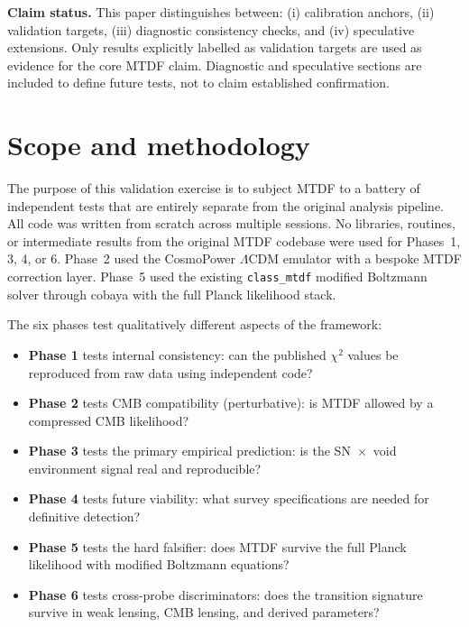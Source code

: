 \documentclass[11pt,a4paper]{article}
\begin{document}
\tableofcontents

\begin{mdframed}[linecolor=accent,linewidth=0.5pt,backgroundcolor=callout-bg,leftline=true,rightline=true,topline=true,bottomline=true,innerleftmargin=8pt,innerrightmargin=8pt,innertopmargin=6pt,innerbottommargin=6pt]
\textbf{Claim status.}
This paper distinguishes between:
(i) calibration anchors,
(ii) validation targets,
(iii) diagnostic consistency checks, and
(iv) speculative extensions.
Only results explicitly labelled as validation targets are used as evidence for the core MTDF claim. Diagnostic and speculative sections are included to define future tests, not to claim established confirmation.
\end{mdframed}

\section{Scope and methodology}
\label{sec:sec1}
The purpose of this validation exercise is to subject MTDF to a battery of independent tests that are entirely separate from the original analysis pipeline. All code was written from scratch across multiple sessions. No libraries, routines, or intermediate results from the original MTDF codebase were used for Phases~1, 3, 4, or 6. Phase~2 used the CosmoPower $\Lambda$CDM emulator with a bespoke MTDF correction layer. Phase~5 used the existing \texttt{class\_\allowbreak{}mtdf} modified Boltzmann solver through cobaya with the full Planck likelihood stack.

The six phases test qualitatively different aspects of the framework:

\begin{itemize}
  \item \textbf{Phase 1} tests internal consistency: can the published $\chi$$^{2}$ values be reproduced from raw data using independent code?
  \item \textbf{Phase 2} tests CMB compatibility (perturbative): is MTDF allowed by a compressed CMB likelihood?
  \item \textbf{Phase 3} tests the primary empirical prediction: is the SN~$\times$~void environment signal real and reproducible?
  \item \textbf{Phase 4} tests future viability: what survey specifications are needed for definitive detection?
  \item \textbf{Phase 5} tests the hard falsifier: does MTDF survive the full Planck likelihood with modified Boltzmann equations?
  \item \textbf{Phase 6} tests cross-probe discriminators: does the transition signature survive in weak lensing, CMB lensing, and derived parameters?
\end{itemize}
\end{document}
